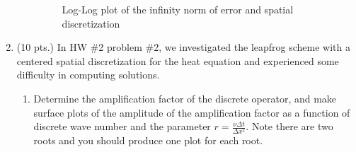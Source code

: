 \documentclass[11pt]{article}
\newcommand{\dx}{\Delta x}
\newcommand{\dt}{\Delta t}
\begin{document}
\begin{enumerate}
\begin{enumerate}
\begin{figure}[htp]
    \caption{Log-Log plot of the infinity norm of error and spatial discretization}
    \label{fig:q23}
    \end{figure}
    \end{enumerate}
  \item (10 pts.) {\color{red}In HW \#2 problem \#2, we investigated the leapfrog scheme with a centered spatial discretization for the heat equation and experienced some difficulty in computing solutions.}
    \begin{enumerate}
      \item {\color{blue}Determine the amplification factor of the discrete operator, and make surface plots of the amplitude of the amplification factor as a function of discrete wave number and the parameter} $r=\frac{\nu\dt}{\dx^2}${\color{blue}. Note there are two roots and you should produce one plot for each root.} \\
      

\end{enumerate}
\end{enumerate}
\end{document}
